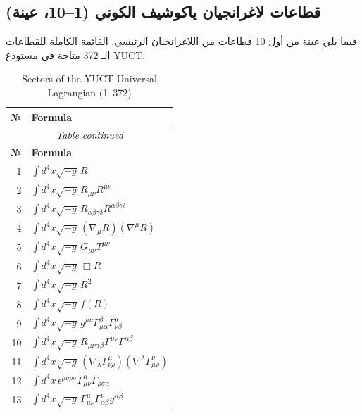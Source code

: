 \documentclass[12pt,a4paper]{article}
\begin{document}
	\subsection{قطاعات لاغرانجيان ياكوشيف الكوني (1–10، عينة)}
	\label{sec:sectors}
	
	فيما يلي عينة من أول 10 قطاعات من اللاغرانجيان الرئيسي. القائمة الكاملة للقطاعات الـ 372 متاحة في مستودع YUCT.
	
	\scriptsize
\begin{longtable}{r p{}}
	\caption{Sectors of the YUCT Universal Lagrangian (1–372)}\label{tab:sectors-100}\\
	\toprule
	\textbf{№} & \textbf{Formula} \\
	\midrule
	\endfirsthead
	\multicolumn{2}{c}{\textit{Table continued}}\\
	\toprule
	\textbf{№} & \textbf{Formula} \\
	\midrule
	\endhead
	\bottomrule
	\endfoot
	1 & \(\displaystyle \int d^4x\sqrt{-g}\,R\) \\
	2 & \(\displaystyle \int d^4x\sqrt{-g}\,R_{\mu\nu}R^{\mu\nu}\) \\
	3 & \(\displaystyle \int d^4x\sqrt{-g}\,R_{\alpha\beta\gamma\delta}R^{\alpha\beta\gamma\delta}\) \\
	4 & \(\displaystyle \int d^4x\sqrt{-g}\,(\nabla_\mu R)(\nabla^\mu R)\) \\
	5 & \(\displaystyle \int d^4x\sqrt{-g}\,G_{\mu\nu}T^{\mu\nu}\) \\
	6 & \(\displaystyle \int d^4x\sqrt{-g}\,\Box R\) \\
	7 & \(\displaystyle \int d^4x\sqrt{-g}\,R^2\) \\
	8 & \(\displaystyle \int d^4x\sqrt{-g}\,f(R)\) \\
	9 & \(\displaystyle \int d^4x\sqrt{-g}\,g^{\mu\nu}\Gamma^{\beta}_{\mu\alpha}\Gamma^{\alpha}_{\nu\beta}\) \\
	10 & \(\displaystyle \int d^4x\sqrt{-g}\,R_{\mu\nu\alpha\beta}\Gamma^{\mu\nu}\Gamma^{\alpha\beta}\) \\
	11 & \(\displaystyle \int d^4x\sqrt{-g}\,(\nabla_\lambda\Gamma^{\mu}_{\nu\rho})(\nabla^\lambda\Gamma^{\nu}_{\mu\rho})\) \\
	12 & \(\displaystyle \int d^4x\,\epsilon^{\mu\nu\rho\sigma}\Gamma^{\alpha}_{\mu\nu}\Gamma_{\rho\sigma\alpha}\) \\
	13 & \(\displaystyle \int d^4x\sqrt{-g}\,\Gamma^{\mu}_{\mu\nu}\Gamma^{\nu}_{\alpha\beta}g^{\alpha\beta}\) \\

\end{longtable}
\end{document}
